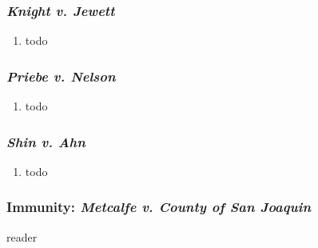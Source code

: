 \subsubsection{\emph{Knight v. Jewett}} %

\begin{enumerate}
    \item todo
\end{enumerate}

\subsubsection{\emph{Priebe v. Nelson}} %

\begin{enumerate}
    \item todo
\end{enumerate}

\subsubsection{\emph{Shin v. Ahn}} %

\begin{enumerate}
    \item todo
\end{enumerate}

\subsubsection{Immunity: \emph{Metcalfe v. County of San Joaquin}} %
reader

